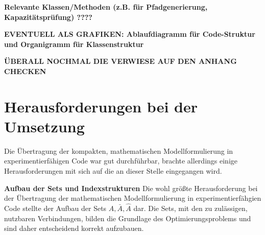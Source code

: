 \textbf{Relevante Klassen/Methoden (z.B. für Pfadgenerierung, Kapazitätsprüfung) ????}

\textbf{EVENTUELL ALS GRAFIKEN: Ablaufdiagramm für Code-Struktur und Organigramm für Klassenstruktur}

\textbf{ÜBERALL NOCHMAL DIE VERWIESE AUF DEN ANHANG CHECKEN}

\section{Herausforderungen bei der Umsetzung}
Die Übertragung der kompakten, mathematischen Modellformulierung in experimentierfähigen Code war gut durchführbar, brachte allerdings einige Herausforderungen mit sich auf die an dieser Stelle eingegangen wird.

\textbf{Aufbau der Sets und Indexstrukturen}
Die wohl größte Herausforderung bei der Übertragung der mathematischen Modellformulierung in experimentierfähgien Code stellte der Aufbau der Sets $A, \bar{A}, \hat{A}$ dar. Die Sets, mit den zu zulässigen, nutzbaren Verbindungen, bilden die Grundlage des Optimierungsproblems und sind daher entscheidend korrekt aufzubauen.

\textbf{}

